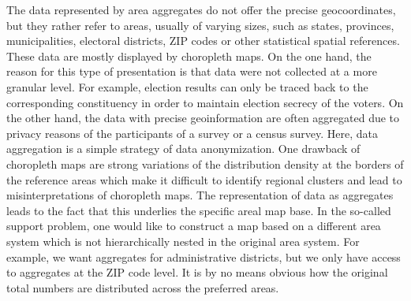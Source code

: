The data represented by area aggregates do not offer the precise geocoordinates, but they rather refer to areas, usually of varying sizes, such as states, provinces, municipalities, electoral districts, ZIP codes or other statistical spatial references.
These data are mostly displayed by  choropleth maps.
On the one hand, the reason for this type of presentation is that data were not collected at a more granular level. 
For example, election results can only be traced back to the corresponding constituency in order to maintain election secrecy of the voters.
On the other hand, the data with precise geoinformation are often aggregated due to privacy reasons of the participants of a survey or a census survey. Here, data aggregation is a simple strategy of data anonymization.
One drawback of choropleth maps are strong variations  of the distribution density at the borders of the reference areas which make it difficult to identify regional clusters and lead to   misinterpretations of choropleth maps. 
The representation of data as aggregates leads to the fact that this underlies the specific areal map base.
In the so-called support problem, one would like to construct a map based on a different area system which is not hierarchically nested in the original area system.
For example, we want aggregates for administrative districts, but we only have access to aggregates at the ZIP code level. It is by no means obvious how the original total numbers are distributed across the preferred areas.\\

